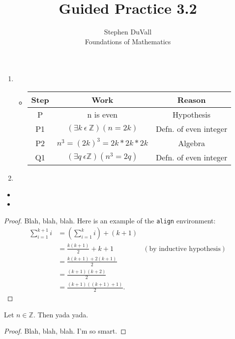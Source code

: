 \documentclass[12pt]{article}
\newcommand{\Z}{\mathbb{Z}}
\newenvironment{theorem}[2][Theorem]{\begin{trivlist}
\item[\hskip \labelsep {\bfseries #1}\hskip \labelsep {\bfseries #2.}]}{\end{trivlist}}
\newenvironment{prchk}[2][Progress Check]{\begin{trivlist}
\item[\hskip \labelsep {\bfseries #1}\hskip \labelsep {\bfseries #2.}]}{\end{trivlist}}
\newenvironment{bgact}[2][Beginning Activity]{\begin{trivlist}
\item[\hskip \labelsep {\bfseries #1}\hskip \labelsep {\bfseries #2.}]}{\end{trivlist}}
\newenvironment{exe}[2][Exercise]{\begin{trivlist}
\item[\hskip \labelsep {\bfseries #1}\hskip \labelsep {\bfseries #2.}]}{\end{trivlist}}
\begin{document}
\title{Guided Practice 3.2}
\author{Stephen DuVall \\
Foundations of Mathematics}

\maketitle

\begin{bgact}{3.21}
\hfill
\begin{enumerate}
\item[1.] \begin{itemize}
        \item[(a)]
            \begin{tabular}{ |c|c|c| } 
                \hline
                Step & Work & Reason \\ \hline
                P & n is even & Hypothesis \\ \hline
                P1 & $(\exists k\ \epsilon\ \mathbb{Z})(n = 2k)$ & Defn. of even integer \\ \hline
                P2 & $n^{3} = (2k)^{3} = 2k * 2k * 2k$ & Algebra \\ \hline
                Q1 & $(\exists q\ \epsilon \mathbb{Z})(n^{3} = 2q)$ & Defn. of even integer\\ \hline
            \end{tabular}
    \end{itemize}
\item[5.]
\end{enumerate}
\end{bgact}

\begin{prchk}{x.yz}
\hfill
\begin{itemize}
\item[(a)]
\item[(b)]
\end{itemize}
\end{prchk}

\begin{exe}{x.yz}
\hfill
\end{exe}

\begin{theorem}{x.yz}
\end{theorem}

\begin{proof}
Blah, blah, blah.  Here is an example of the \texttt{align} environment:
\begin{align*}
\sum_{i=1}^{k+1}i & = \left(\sum_{i=1}^{k}i\right) +(k+1)\\
& = \frac{k(k+1)}{2}+k+1 & (\text{by inductive hypothesis})\\
& = \frac{k(k+1)+2(k+1)}{2}\\
& = \frac{(k+1)(k+2)}{2}\\
& = \frac{(k+1)((k+1)+1)}{2}.
\end{align*}
\end{proof}

\begin{theorem}{x.yz}
Let $n\in \Z$.  Then yada yada.
\end{theorem}

\begin{proof}
Blah, blah, blah.  I'm so smart.
\end{proof}
\end{document}
